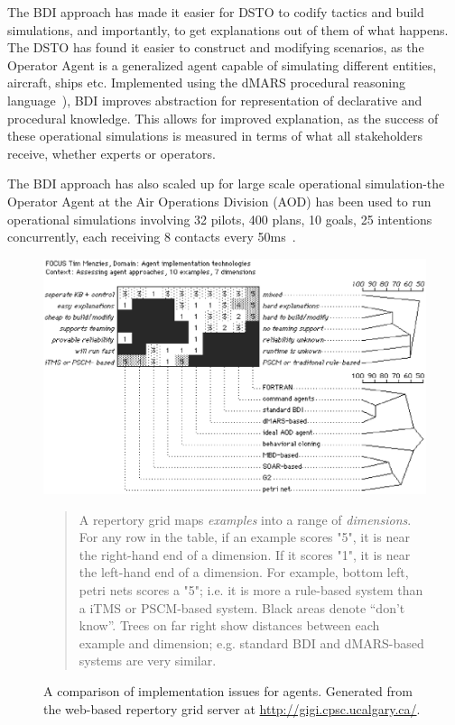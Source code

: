 The BDI approach has made it easier for DSTO to codify tactics and
build simulations, and importantly, to get explanations out of
them of what happens. The DSTO has found it easier to construct
and modifying scenarios, as the Operator Agent is a generalized
agent capable of simulating different entities, aircraft, ships
etc. Implemented using the dMARS procedural reasoning
language~\cite{dinv98}), BDI improves abstraction for
representation of declarative and procedural knowledge. This
allows for improved explanation, as the success of these
operational simulations is measured in terms of what all
stakeholders receive, whether experts or operators.

The BDI approach has also scaled up for large scale operational
simulation-the Operator Agent at the Air Operations Division (AOD)
has been used to run operational simulations involving 32 pilots,
400 plans, 10 goals, 25 intentions concurrently, each receiving 8
contacts every 50ms~\cite{tidhar99}.

\begin{figure}[!t]
\begin{center}
\includegraphics[width=5in]{table.eps}
{\em  {\sffamily
\begin{quote}
A repertory grid maps {\em examples} into a range of {\em dimensions}. For any
row in the table, if an example scores "5", it is near the right-hand end of a
dimension. If it scores "1", it is near the left-hand end of a dimension. For
example, bottom left, petri nets scores a "5"; i.e. it is more a rule-based
system than a iTMS or PSCM-based system. Black areas denote ``don't know''.
Trees on far right show distances between each example and dimension; e.g.
standard BDI and dMARS-based systems are very similar.

\end{quote}
}}
\end{center}
\caption{A comparison of implementation issues for agents.
Generated from the web-based repertory grid server at
\protect\url{http://gigi.cpsc.ucalgary.ca/}.
 }\label{fig:table}
\end{figure}



